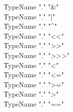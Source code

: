 \begin{grammar}
    \|   TypeName  \xcd"."  \xcd"&"\\
    \|   TypeName  \xcd"."  \xcd"|"\\
    \|   TypeName  \xcd"."  \xcd"^"\\
    \|   TypeName  \xcd"."  \xcd"<<"\\
    \|   TypeName  \xcd"."  \xcd">>"\\
    \|   TypeName  \xcd"."  \xcd">>>"\\
    \|   TypeName  \xcd"."  \xcd"<"\\
    \|   TypeName  \xcd"."  \xcd"<="\\
    \|   TypeName  \xcd"."  \xcd">="\\
    \|   TypeName  \xcd"."  \xcd">"\\
    \|   TypeName  \xcd"."  \xcd"=="\\
\end{grammar}

